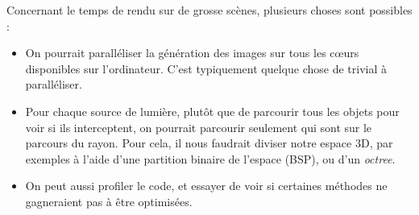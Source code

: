 \documentclass[a4paper]{article}
\begin{document}
    Concernant le temps de rendu sur de grosse scènes, plusieurs choses sont possibles :
    \begin{itemize}
        \item On pourrait paralléliser la génération des images sur tous les cœurs disponibles sur l'ordinateur. C'est typiquement quelque chose de trivial à paralléliser.
        \item Pour chaque source de lumière, plutôt que de parcourir tous les objets pour voir si ils interceptent, on pourrait parcourir seulement qui sont sur le parcours du rayon.
              Pour cela, il nous faudrait diviser notre espace 3D, par exemples à l'aide d'une partition binaire de l'espace (BSP), ou d'un \textit{octree}.
        \item On peut aussi profiler le code, et essayer de voir si certaines méthodes ne gagneraient pas à être optimisées.
    \end{itemize}
\end{document}
